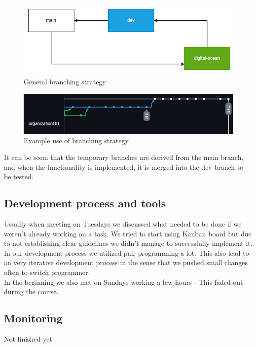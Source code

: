 \begin{figure}[H]
    \centering
    \captionsetup{justification=centering,margin=1cm}
    \includegraphics[width=0.7\linewidth]{report/images/branching.png}
    \caption{General branching strategy}
    \label{fig:gen_branch}
\end{figure}

\begin{figure}[H]
    \centering
    \captionsetup{justification=centering,margin=1cm}
    \includegraphics[width=0.7\linewidth]{report/images/git_branching.png}
    \caption{Example use of branching strategy}
    \label{fig:ex_branch}
\end{figure}

It can be seem that the temporary branches are derived from the main branch, and when the functionality is implemented, 
it is merged into the dev branch to be tested. 

\subsection{Development process and tools}
Usually when meeting on Tuesdays we discussed what needed to be done if we weren't already working on a task. We tried to start using Kanban board but due to not establishing 
clear guidelines we didn't manage to successfully implement it. In our development process we utilized pair-programming a lot. This also lead to an very iterative development 
process in the sense that we pushed small changes often to switch programmer.\\

In the beginning we also met on Sundays working a few hours - This faded out during the course.

\subsection{Monitoring}
Not finished yet

